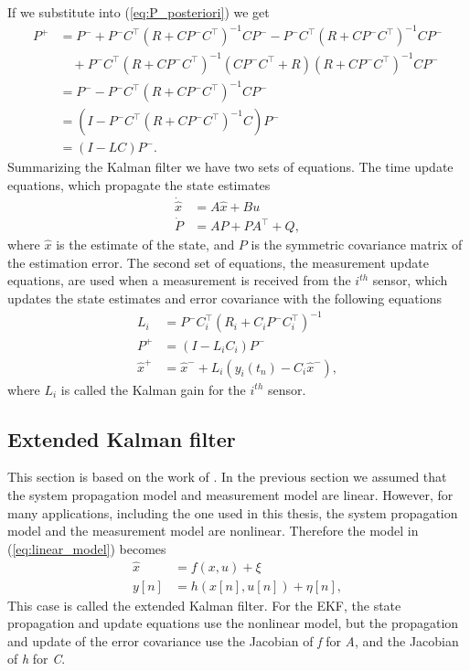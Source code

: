 If we substitute into (\ref{eq:P_posteriori}) we get
\begin{align*}
P^+&= P^-+P^-C^\top(R+CP^-C^\top)^{-1}CP^- -P^-C^\top(R+CP^-C^\top)^{-1}CP^- \\
   &  \quad +P^-C^\top(R+CP^-C^\top)^{-1}(CP^-C^\top+R)(R+CP^-C^\top)^{-1}CP^- \\
   &= P^- -P^-C^\top(R+CP^-C^\top)^{-1}CP^-\\
   &= (I-P^-C^\top(R+CP^-C^\top)^{-1}C)P^- \\
   &= (I-LC)P^-.
\end{align*}
Summarizing the Kalman filter we have two sets of equations. The time update equations, which propagate the state estimates
\begin{align}
\dot{\hat{x}}&= A\hat{x}+Bu\\
\dot{P}&= AP+PA^\top+Q,
\end{align}
where \begin{math} \hat{x} \end{math} is the estimate of the state, and \begin{math} P \end{math} is the symmetric covariance matrix of the estimation error. The second set of equations, the measurement update equations, are used when a measurement is received from the \begin{math} i^{th}\end{math} sensor, which updates the state estimates and error covariance with the following equations
\begin{align}
L_i &= P^-C_i^\top(R_i+C_iP^-C_i^\top)^{-1} \\
P^+ &= (I-L_iC_i)P^- \\
\hat{x}^+ &= \hat{x}^- +L_i(y_i(t_n)-C_i\hat{x}^-),
\end{align}
where \begin{math} L_i \end{math} is called the Kalman gain for the \begin{math} i^{th}\end{math} sensor.

\subsection{Extended Kalman filter}{\label{sub:EKF}}

This section is based on the work of \cite{Beard2010}. In the previous section we assumed that the system propagation model and measurement model are linear. However, for many applications, including the one used in this thesis, the system propagation model and the measurement model are nonlinear. Therefore the model in (\ref{eq:linear_model}) becomes
\begin{align}
\hat{x}&=f(x,u)+\xi \\
y[n]&=h(x[n],u[n])+\eta[n],
\end{align}
This case is called the extended Kalman filter. For the EKF, the state propagation and update equations use the nonlinear model, but the propagation and update of the error covariance use the Jacobian of \textit{f} for \textit{A}, and the Jacobian of \textit{h} for \textit{C}.

